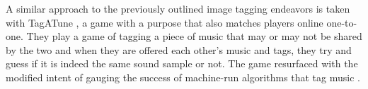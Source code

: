 \documentclass[preprint,authoryear,12pt]{elsarticle}
\makeatletter
\renewcommand{\paragraph}{\@startsection{paragraph}{4}{\z@}%
  {-3.25ex\@plus -1ex \@minus -.2ex}%
  {1.5ex \@plus .2ex}%
  {\normalfont\normalsize\mdseries}}
\makeatother
\begin{document}


A similar approach to the previously outlined image tagging endeavors is taken with TagATune \citep{Law:2009}, a game with a purpose that also matches players online one-to-one. They play a game of tagging a piece of music that may or may not be shared by the two and when they are offered each other's music and tags, they try and guess if it is indeed the same sound sample or not. The game resurfaced with the modified intent of gauging the success of machine-run algorithms that tag music \citep{vonAhn&Law:2009}.





\end{document}
